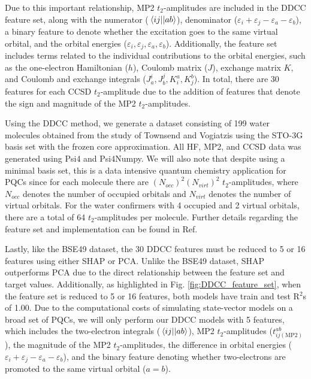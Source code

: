 \documentclass[journal=jacsat,manuscript=article]{achemso}
\begin{document}
Due to this important relationship, MP2 $t_{2}$-amplitudes are included in the DDCC feature set, along with the numerator ($\mel{ij}{}{ab}$), denominator ($\varepsilon_{i}+\varepsilon_{j}-\varepsilon_{a}-\varepsilon_{b}$), a binary feature to denote whether the excitation goes to the same virtual orbital, and the orbital energies ($\varepsilon_{i},\varepsilon_{j},\varepsilon_{a},\varepsilon_{b}$).
Additionally, the feature set includes terms related to the individual contributions to the orbital energies, such as the one-electron Hamiltonian ($h$), Coulomb matrix ($J$), exchange matrix $K$, and Coulomb and exchange integrals ($J^{i}_{a},J^{j}_{b},K^{a}_{i},K^{b}_{j}$).
In total, there are 30 features for each CCSD $t_{2}$-amplitude due to the addition of features that denote the sign and magnitude of the MP2 $t_{2}$-amplitudes.

Using the DDCC method, we generate a dataset consisting of 199 water molecules obtained from the study of Townsend and Vogiatzis using the STO-3G basis set\cite{hehre_selfconsistent_1970}  with the frozen core approximation.
All HF, MP2, and CCSD data was generated using Psi4\cite{parrish_psi4_2017} and Psi4Numpy\cite{smith_psi4numpy_2018}.
We will also note that despite using a minimal basis set, this is a data intensive quantum chemistry application for PQCs since for each molecule there are $(N_{occ})^{2}(N_{virt})^{2}$ $t_{2}$-amplitudes, where $N_{occ}$ denotes the number of occupied orbitals and $N_{virt}$ denotes the number of virtual orbitals.
For the water confirmers with 4 occupied and 2 virtual orbitals, there are a total of 64 $t_{2}$-amplitudes per molecule.
Further details regarding the feature set and implementation can be found in Ref.  \cite{townsend_data-driven_2019}

Lastly, like the BSE49 dataset, the 30 DDCC features must be reduced to 5 or 16 features using either SHAP or PCA.
Unlike the BSE49 dataset, SHAP outperforms PCA due to the direct relationship between the feature set and target values.
Additionally, as highlighted in Fig. \ref{fig:DDCC_feature_set}, when the feature set is reduced to 5 or 16 features, both models have train and test R$^{2}$s of 1.00.
Due to the computational costs of simulating state-vector models on a broad set of PQCs, we will only perform our DDCC models with 5 features, which includes the two-electron integrals ($\mel{ij}{}{ab}$), MP2 $t_{2}$-amplitudes ($t^{ab}_{ij(\text{MP2})}$), the magnitude of the MP2 $t_{2}$-amplitudes, the difference in orbital energies ($\varepsilon_{i}+\varepsilon_{j}-\varepsilon_{a}-\varepsilon_{b}$), and the binary feature denoting whether two-electrons are promoted to the same virtual orbital ($a=b$).
\end{document}
